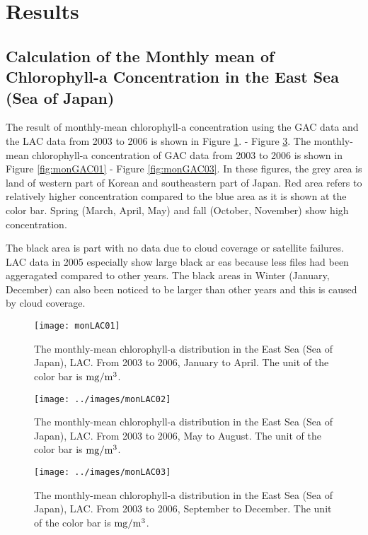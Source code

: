 \section{Results}

\subsection{Calculation of the Monthly mean of Chlorophyll-a Concentration in the East Sea (Sea of Japan)}


The result of monthly-mean chlorophyll-a concentration using the GAC data and the LAC data from 2003 to 2006 is shown in Figure \ref{fig:monLAC01}. - Figure \ref{fig:monLAC03}. The monthly-mean chlorophyll-a concentration of GAC data from 2003 to 2006 is shown in Figure \ref{fig:monGAC01} - Figure \ref{fig:monGAC03}. In these figures, the grey area is land of western part of Korean and southeastern part of Japan. Red area refers to relatively higher concentration compared to the blue area as it is shown at the color bar. Spring (March, April, May) and fall (October, November) show high concentration. 

The black area is part with no data due to cloud coverage or satellite failures. LAC data in 2005 especially show large black ar eas because less files had been aggeragated compared to other years. The black areas in Winter (January, December) can also been noticed to be larger than other years and this is caused by cloud coverage.

\begin{figure}[h]
	\centering
	\texttt{[image: monLAC01]}\\
	\scriptsize\caption{The monthly-mean chlorophyll-a distribution in the East Sea (Sea of Japan), LAC. From 2003 to 2006, January to April. The unit of the color bar is $\rm mg/m^3$.}
	\label{fig:monLAC01}
\end{figure}


\begin{figure}[h]
	\centering
	\texttt{[image: ../images/monLAC02]}\\
	\scriptsize\caption{The monthly-mean chlorophyll-a distribution in the East Sea (Sea of Japan), LAC. From 2003 to 2006, May to August. The unit of the color bar is $\rm mg/m^3$.}
	\label{fig:monLAC02}
\end{figure}

\begin{figure}[h]
	\centering
	\texttt{[image: ../images/monLAC03]}\\
	\scriptsize\caption{The monthly-mean chlorophyll-a distribution in the East Sea (Sea of Japan), LAC. From 2003 to 2006, September to December. The unit of the color bar is $\rm mg/m^3$.}
	\label{fig:monLAC03}
\end{figure}


